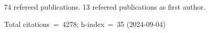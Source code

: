 74 refereed publications. 13 refeered publications as first author.

Total citations~=~4278; h-index~=~35 (2024-09-04)